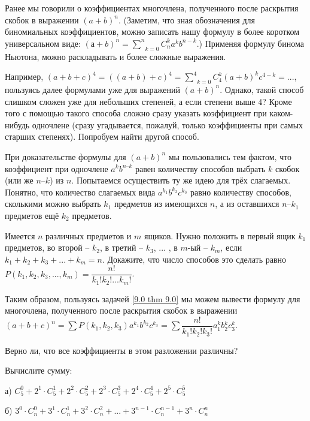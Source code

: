 Ранее мы говорили о коэффициентах многочлена, полученного после раскрытия скобок в выражении
$(a + b)^n$. (Заметим, что зная обозначения для биномиальных коэффициентов, можно записать нашу
формулу в более коротком универсальном виде: $(а + b)^n = \underset{k = 0}{\overset{n}\sum} C^k_n a^k b^{n - k}$.) Применяя формулу бинома
Ньютона, можно раскладывать и более сложные выражения.

\par

Например, $(a + b + c)^4 = ((a + b) + c)^4 = \underset{k = 0}{\overset{4}{\sum}} C^k_4 (a + b)^k c^{4 - k} = ...$, пользуясь далее формулами уже для выражений $(a + b)^n$. Однако, такой способ слишком сложен уже для небольших степеней, а если степени выше 4? Кроме того с помощью такого способа сложно сразу указать коэффициент при каком-нибудь одночлене (сразу угадывается, пожалуй, только коэффициенты при самых старших степенях). Попробуем
найти другой способ.

\par

При доказательстве формулы для $(a + b)^n$ мы пользовались тем фактом, что коэффициент при одночлене $a^k b^{n – k}$ равен количеству способов выбрать $k$ скобок (или же $n – k$) из $n$. Попытаемся осуществить ту же идею для трёх слагаемых. Понятно, что количество слагаемых вида $a^{k_1} b^{k_2} c^{k_3}$ равно количеству способов, сколькими можно выбрать $k_1$ предметов из имеющихся $n$, а из оставшихся $n – k_1$
предметов ещё $k_2$ предметов.

\begin{thm} \label{9.0 thm 9.0}
    Имеется $n$ различных предметов и $m$ ящиков. Нужно положить в первый ящик $k_1$ предметов, во второй -- $k_2$, в третий -- $k_3$, ... , в $m$-ый -- $k_m$, если $k_1 + k_2 + k_3 + ... + k_m = n$. Докажите, что число способов это сделать равно $P(k_1, k_2, k_3, ... , k_m) = \dfrac{n!}{k_1!k_2!...k_m!}$. 
\end{thm}

Таким образом, пользуясь задачей \ref{9.0 thm 9.0} мы можем вывести формулу для многочлена, полученного после
раскрытия скобок в выражении $(a + b + c)^n = \sum P(k_1, k_2, k_3) a^{k_1} b^{k_2} c^{k_3} = \sum \dfrac{n!}{k_1!k_2!k_3!} a{^k_1} b{^k_2} c{^k_3}.$

\begin{ques}
    Верно ли, что все коэффициенты в этом разложении различны?
\end{ques}

\begin{thm}
    Вычислите сумму:
    \par а) $C^0_5 + 2^1 \cdot C^1_5 + 2^2 \cdot C^2_5 + 2^3 \cdot C^3_5 + 2^4 \cdot C^4_5 + 2^5 \cdot C^5_5$
    \par  б)  $3^0 \cdot C^0_n + 3^1 \cdot C^1_n + 3^2 \cdot C^2_n + ... + 3^{n - 1} \cdot C^{n - 1}_n + 3^n \cdot C^n_n$
\end{thm}

